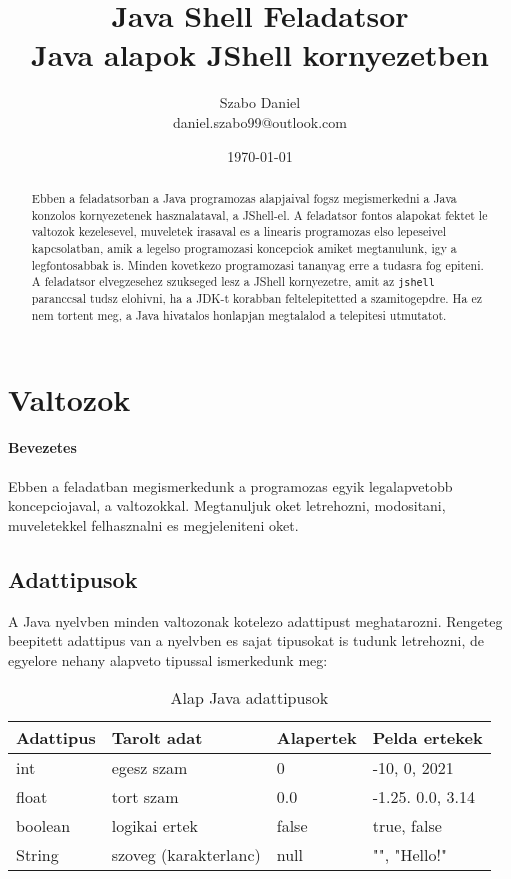 \documentclass{article}
\title{%
Java Shell Feladatsor \\
\large Java alapok JShell kornyezetben}
\author{Szabo Daniel\\daniel.szabo99@outlook.com}
\date{\today}
\begin{document}
\maketitle
\begin{abstract}
Ebben a feladatsorban a Java programozas alapjaival fogsz megismerkedni a Java konzolos kornyezetenek hasznalataval, a JShell-el. A feladatsor fontos alapokat fektet le valtozok kezelesevel, muveletek irasaval es a linearis programozas elso lepeseivel kapcsolatban, amik a legelso programozasi koncepciok amiket megtanulunk, igy a legfontosabbak is. Minden kovetkezo programozasi tananyag erre a tudasra fog epiteni. A feladatsor elvegzesehez szukseged lesz a JShell kornyezetre, amit az \lstinline{jshell} paranccsal tudsz elohivni, ha a JDK-t korabban feltelepitetted a szamitogepdre. Ha ez nem tortent meg, a Java hivatalos honlapjan megtalalod a telepitesi utmutatot.
\end{abstract}

\newpage

\tableofcontents{}

\newpage

\section{Valtozok}

\paragraph{Bevezetes}

Ebben a feladatban megismerkedunk a programozas egyik legalapvetobb koncepciojaval, a valtozokkal. Megtanuljuk oket letrehozni, modositani, muveletekkel felhasznalni es megjeleniteni oket.

\subsection{Adattipusok}

A Java nyelvben minden valtozonak kotelezo adattipust meghatarozni. Rengeteg beepitett adattipus van a nyelvben es sajat tipusokat is tudunk letrehozni, de egyelore nehany alapveto tipussal ismerkedunk meg:

\begin{table}[H]
    \begin{tabular}{|l|l|l|l|}
        \hline
        \textbf{Adattipus} & \textbf{Tarolt adat}  & \textbf{Alapertek} & \textbf{Pelda ertekek} \\ \hline
        int                & egesz szam            & 0                  & -10, 0, 2021           \\ \hline
        float              & tort szam             & 0.0                & -1.25. 0.0, 3.14       \\ \hline
        boolean            & logikai ertek         & false              & true, false            \\ \hline
        String             & szoveg (karakterlanc) & null               & "", "Hello!"           \\ \hline
    \end{tabular}
    \caption{Alap Java adattipusok}
    \label{tab:adattipusok}
\end{table}
\end{document}
